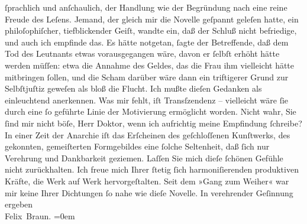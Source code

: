 \begin{ledgroupsized}[t]{13cm}
                    ſprachlich und anſchaulich, der Hand{\pb}lung wie der
                    Begründung nach eine reine Freude des Leſens.\pend
           \pstart
           Jemand, der gleich mir die
                        Novelle geſpannt geleſen
                    hatte, ein philoſophiſcher, tiefblickender Geiſt, wandte ein, daß der Schluß
                    nicht befriedige, und auch ich empfinde das. Es hätte notgetan, ſagte der Betreffende, daß dem Tod
                    des Leutnants etwas vorausgegangen wäre, davon er ſelbſt erhöht hätte werden
                    müſſen: etwa die Annahme des Geldes, das die Frau ihm vielleicht hätte
                    mitbringen ſollen, und die Scham darüber wäre dann ein triftigerer Grund zur
                    Selbſtjuſtiz geweſen als bloß die Flucht. Ich {\pb}mußte dieſen
                    Gedanken als einleuchtend anerkennen. Was mir fehlt, iſt Transſzendenz –
                    vielleicht wäre ſie durch eine ſo geführte Linie der Motivierung ermöglicht
                    worden. Nicht wahr, Sie ſind mir nicht böſe, Herr Doktor, wenn ich aufrichtig
                    meine Empfindung ſchreibe?\pend
           \pstart
           In einer Zeit der Anarchie iſt das Erſcheinen des geſchloſſenen Kunſtwerks, des
                    gekonnten, gemeiſterten Formgebildes eine ſolche Seltenheit, daß ſich nur
                    Verehrung und Dankbarkeit geziemen. Laſſen Sie mich dieſe ſchönen Gefühle nicht
                    zurückhalten. Ich freue mich Ihrer ſtetig ſich harmoni{\pb}ſierenden
                    produktiven Kräfte, die Werk auf Werk hervorgeſtalten. Seit dem »Gang zum Weiher« war mir keine Ihrer
                    Dichtungen ſo nahe wie dieſe Novelle.\pend
           \pstart
           In verehrender Geſinnung ergeben{\\[\baselineskip]}\spacefill\mbox{Felix Braun.}\pend
           \leftskip=0em{}
         
         \endnumbering{}\end{ledgroupsized}  \newcommand{\dateiname}{L02486}\newcommand{\titel}{Felix Braun an Arthur Schnitzler, 10. 5. 1927}\newcommand{\editorInnen}{Martin Anton Müller und Gerd-Hermann Susen}
      